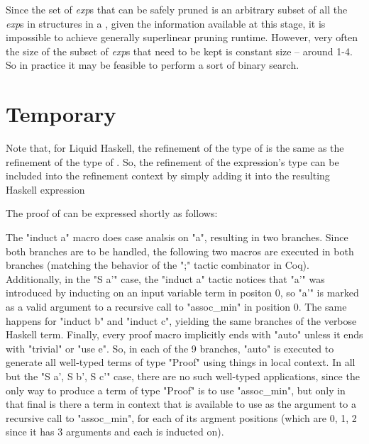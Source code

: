 Since the set of \textit{exp}s that can be safely pruned is an arbitrary subset of all the \textit{exp}s in  structures in a \LangBTerm, given the information available at this stage, it is impossible to achieve generally superlinear pruning runtime. 
However, very often the size of the subset of \textit{exp}s that need to be kept is constant size -- around 1-4.
So in practice it may be feasible to perform a sort of binary search.

\section*{Temporary}

Note that, for Liquid Haskell, the refinement of the type of  is the same as the refinement of the type of .
So, the refinement of the expression's type can be included into the refinement context by simply adding it into the resulting Haskell expression

The proof of  can be expressed shortly as follows:
  
 The "induct a" macro does case analsis on "a", resulting in two branches. Since both branches are to be handled, the following two macros are executed in both branches (matching the behavior of the ";" tactic combinator in Coq).
 Additionally, in the "S a'" case, the "induct a" tactic notices that "a'" was introduced by inducting on an input variable term in positon 0, so "a'" is marked as a valid argument to a recursive call to "assoc\_min" in position 0.
 The same happens for "induct b" and "induct c", yielding the same branches of the verbose Haskell term.
 Finally, every proof macro implicitly ends with "auto" unless it ends with "trivial" or "use e".
 So, in each of the 9 branches, "auto" is executed to generate all well-typed terms of type "Proof" using things in local context.
 In all but the "S a', S b', S c'" case, there are no such well-typed applications, since the only way to produce a term of type "Proof" is to use "assoc\_min", but only in that final is there a term in context that is available to use as the argument to a recursive call to "assoc\_min", for each of its argment positions (which are 0, 1, 2 since it has 3 arguments and each is inducted on).
  
